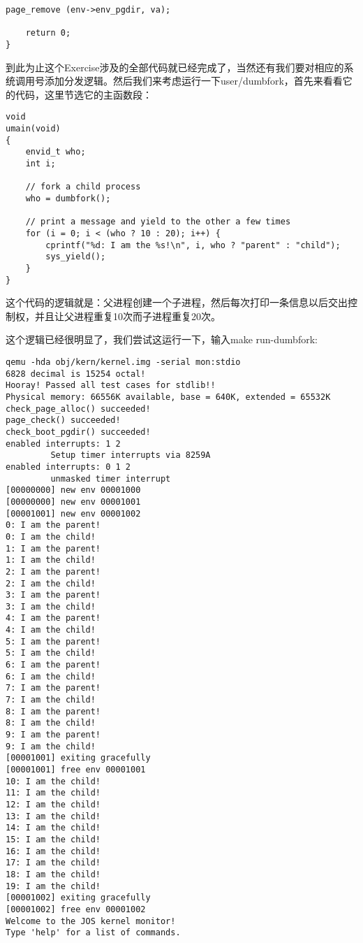 \documentclass{article}
\begin{document}
\begin{CJK*}{UTF8}{gkai}
\begin{lstlisting}[style=ccode, title={\scriptsize \ttfamily \bfseries kern/syscall.c: sys\_page\_unmap()}]
    page_remove (env->env_pgdir, va);

    return 0;
}
\end{lstlisting}

到此为止这个Exercise涉及的全部代码就已经完成了，当然还有我们要对相应的系统调用号添加分发逻辑。然后我们来考虑运行一下user/dumbfork，首先来看看它的代码，这里节选它的主函数段：


\begin{lstlisting}[style=ccode, firstnumber=9, title={\scriptsize \ttfamily \bfseries user/dumbfork.c: umain()}]
void
umain(void)
{
	envid_t who;
	int i;

	// fork a child process
	who = dumbfork();

	// print a message and yield to the other a few times
	for (i = 0; i < (who ? 10 : 20); i++) {
		cprintf("%d: I am the %s!\n", i, who ? "parent" : "child");
		sys_yield();
	}
}
\end{lstlisting}

这个代码的逻辑就是：父进程创建一个子进程，然后每次打印一条信息以后交出控制权，并且让父进程重复10次而子进程重复20次。

这个逻辑已经很明显了，我们尝试这运行一下，输入make run-dumbfork:


\begin{lstlisting}[style=console]
qemu -hda obj/kern/kernel.img -serial mon:stdio
6828 decimal is 15254 octal!
Hooray! Passed all test cases for stdlib!!
Physical memory: 66556K available, base = 640K, extended = 65532K
check_page_alloc() succeeded!
page_check() succeeded!
check_boot_pgdir() succeeded!
enabled interrupts: 1 2
	     Setup timer interrupts via 8259A
enabled interrupts: 0 1 2
	     unmasked timer interrupt
[00000000] new env 00001000
[00000000] new env 00001001
[00001001] new env 00001002
0: I am the parent!
0: I am the child!
1: I am the parent!
1: I am the child!
2: I am the parent!
2: I am the child!
3: I am the parent!
3: I am the child!
4: I am the parent!
4: I am the child!
5: I am the parent!
5: I am the child!
6: I am the parent!
6: I am the child!
7: I am the parent!
7: I am the child!
8: I am the parent!
8: I am the child!
9: I am the parent!
9: I am the child!
[00001001] exiting gracefully
[00001001] free env 00001001
10: I am the child!
11: I am the child!
12: I am the child!
13: I am the child!
14: I am the child!
15: I am the child!
16: I am the child!
17: I am the child!
18: I am the child!
19: I am the child!
[00001002] exiting gracefully
[00001002] free env 00001002
Welcome to the JOS kernel monitor!
Type 'help' for a list of commands.
\end{lstlisting}


\end{CJK*}
\end{document}
